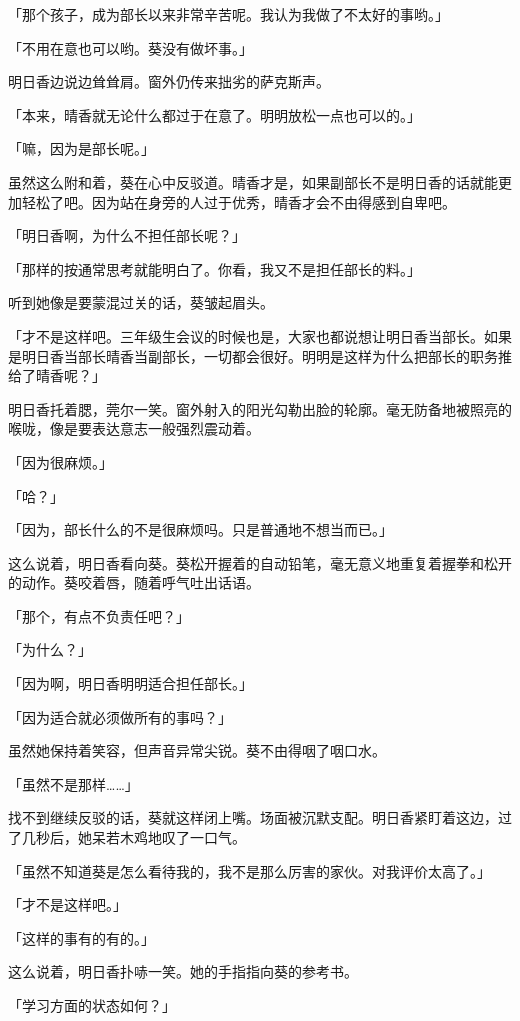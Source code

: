 \documentclass[UTF8]{ctexart}
\begin{document}
    「那个孩子，成为部长以来非常辛苦呢。我认为我做了不太好的事哟。」

    「不用在意也可以哟。葵没有做坏事。」

    明日香边说边耸耸肩。窗外仍传来拙劣的萨克斯声。

    「本来，晴香就无论什么都过于在意了。明明放松一点也可以的。」

    「嘛，因为是部长呢。」

    虽然这么附和着，葵在心中反驳道。晴香才是，如果副部长不是明日香的话就能更加轻松了吧。因为站在身旁的人过于优秀，晴香才会不由得感到自卑吧。

    「明日香啊，为什么不担任部长呢？」

    「那样的按通常思考就能明白了。你看，我又不是担任部长的料。」

    听到她像是要蒙混过关的话，葵皱起眉头。

    「才不是这样吧。三年级生会议的时候也是，大家也都说想让明日香当部长。如果是明日香当部长晴香当副部长，一切都会很好。明明是这样为什么把部长的职务推给了晴香呢？」

    明日香托着腮，莞尔一笑。窗外射入的阳光勾勒出脸的轮廓。毫无防备地被照亮的喉咙，像是要表达意志一般强烈震动着。

    「因为很麻烦。」

    「哈？」

    「因为，部长什么的不是很麻烦吗。只是普通地不想当而已。」

    这么说着，明日香看向葵。葵松开握着的自动铅笔，毫无意义地重复着握拳和松开的动作。葵咬着唇，随着呼气吐出话语。

    「那个，有点不负责任吧？」

    「为什么？」

    「因为啊，明日香明明适合担任部长。」

    「因为适合就必须做所有的事吗？」

    虽然她保持着笑容，但声音异常尖锐。葵不由得咽了咽口水。

    「虽然不是那样……」

    找不到继续反驳的话，葵就这样闭上嘴。场面被沉默支配。明日香紧盯着这边，过了几秒后，她呆若木鸡地叹了一口气。

    「虽然不知道葵是怎么看待我的，我不是那么厉害的家伙。对我评价太高了。」

    「才不是这样吧。」

    「这样的事有的有的。」

    这么说着，明日香扑哧一笑。她的手指指向葵的参考书。

    「学习方面的状态如何？」
\end{document}
